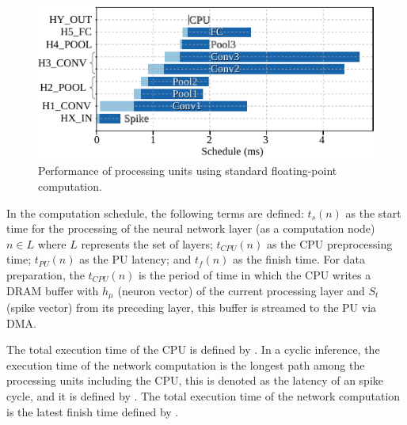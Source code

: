 \begin{figure}[!t]
	\centering
	\includegraphics[width=1\columnwidth]{../figures/latency_pu_fp.pdf}
	\caption{Performance of processing units using standard floating-point computation.}
	\label{fig:latency_pu_fp}
\end{figure}

In the computation schedule, the following terms are defined: $t_s(n)$ as the start time for the processing of the neural network layer (as a computation node) $n\in L$ where $L$ represents the set of layers; $t_{CPU}(n)$ as the CPU preprocessing time; $t_{PU}(n)$ as the PU latency; and $t_f(n)$ as the finish time. For data preparation, the $t_{CPU}(n)$ is the period of time in which the CPU writes a DRAM buffer with $h_\mu$ (neuron vector) of the current processing layer and $S_t$ (spike vector) from its preceding layer, this buffer is streamed to the PU via DMA.

The total execution time of the CPU is defined by . In a cyclic inference, the execution time of the network computation is the longest path among the processing units including the CPU, this is denoted as the latency of an spike cycle, and it is defined by . The total execution time of the network computation is the latest finish time defined by .

